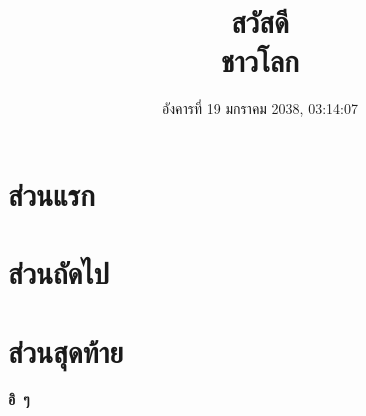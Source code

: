 \documentclass{article}
\title{\Huge\textbf{สวัสดี}\\
\Large ชาวโลก\\
\vspace{-4ex}}
\date{อังคารที่ 19 มกราคม 2038, 03:14:07}
\begin{document}
\begin{titlepage}
\maketitle
\thispagestyle{empty}
\tableofcontents
\end{titlepage}

\newpage
{}
\section{ส่วนแรก}
\blindtext[12]

\section{ส่วนถัดไป}
\blindtext[12]

\section{ส่วนสุดท้าย}
\blindtext[12]

\newpage
\begin{center}
\mbox{\Huge\textbf{อิ ๆ}}
\end{center}
\end{document}

